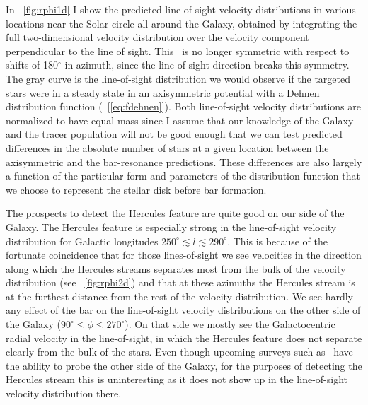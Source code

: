 In \figurename~\ref{fig:rphi1d} I show the predicted line-of-sight
velocity distributions in various locations near the Solar circle all
around the Galaxy, obtained by integrating the full two-dimensional
velocity distribution over the velocity component perpendicular to the
line of sight. This \figurename\ is no longer symmetric with respect
to shifts of 180$^{\circ}$ in azimuth, since the line-of-sight
direction breaks this symmetry. The gray curve is the line-of-sight
distribution we would observe if the targeted stars were in a steady
state in an axisymmetric potential with a Dehnen distribution function
(\eqnname~[\ref{eq:fdehnen}]). Both line-of-sight velocity
distributions are normalized to have equal mass since I assume that
our knowledge of the Galaxy and the tracer population will not be good
enough that we can test predicted differences in the absolute number
of stars at a given location between the axisymmetric and the
bar-resonance predictions. These differences are also largely a
function of the particular form and parameters of the distribution
function that we choose to represent the stellar disk before bar
formation.

The prospects to detect the Hercules feature are quite good on our
side of the Galaxy. The Hercules feature is especially strong in the
line-of-sight velocity distribution for Galactic longitudes
$250^{\circ} \lesssim l \lesssim 290^{\circ}$. This is because of the
fortunate coincidence that for those lines-of-sight we see velocities
in the direction along which the Hercules streams separates most from
the bulk of the velocity distribution (see
\figurename~\ref{fig:rphi2d}) and that at these azimuths the Hercules
stream is at the furthest distance from the rest of the velocity
distribution. We see hardly any effect of the bar on the line-of-sight
velocity distributions on the other side of the Galaxy ($90^{\circ}
\leq \phi \leq 270^{\circ}$). On that side we mostly see the
Galactocentric radial velocity in the line-of-sight, in which the
Hercules feature does not separate clearly from the bulk of the
stars. Even though upcoming surveys such as \apogee\ have the ability
to probe the other side of the Galaxy, for the purposes of detecting
the Hercules stream this is uninteresting as it does not show up in
the line-of-sight velocity distribution there.


